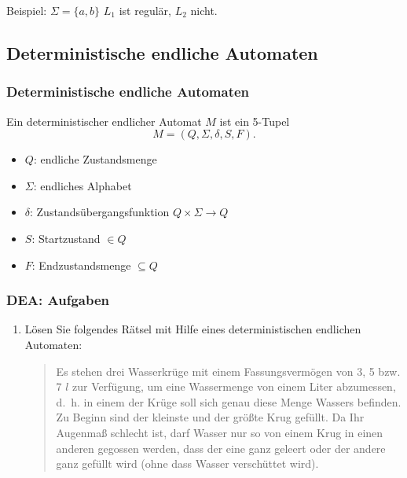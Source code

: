 \documentclass{beamer}
\begin{document}
{\begin{frame}
\begin{itemize}
\end{itemize}
Beispiel:
\(\Sigma = \{a,b\}\)
	\(L_1\) ist regulär, \(L_2\) nicht.
\end{frame}

\subsection{Deterministische endliche Automaten}
\begin{frame}
\frametitle{Deterministische endliche Automaten}
        Ein deterministischer endlicher Automat $M$ ist ein 5-Tupel
        \[
        M= (Q,\Sigma,\delta,S,F).
        \]
        \begin{itemize}
        \item $Q$:  endliche Zustandsmenge
        \item $\Sigma$:    endliches Alphabet
        \item $\delta$:   Zustandsübergangsfunktion $Q\times \Sigma \rightarrow Q$
        \item $S$:   Startzustand $\in Q$
        \item $F$:   Endzustandsmenge $\subseteq Q$
        \end{itemize}
\end{frame}
\begin{frame}
	\frametitle{DEA: Aufgaben}
	\begin{enumerate}
	\item 
		Lösen Sie folgendes Rätsel mit Hilfe eines deterministischen
		endlichen Automaten:
		\begin{quote}
		  Es stehen drei Wasserkrüge mit einem Fassungsvermögen
		  von 3, 5 bzw. 7 $l$ zur Verfügung, um eine Wassermenge von
		  einem Liter abzumessen, d.~h. in einem der Krüge soll sich genau
		  diese Menge Wassers befinden. Zu Beginn sind der kleinste und
		  der größte Krug gefüllt. Da Ihr Augenmaß schlecht
		  ist, darf Wasser nur so von einem Krug in einen anderen
		  gegossen werden, dass der eine ganz geleert oder der andere
		  ganz gefüllt wird (ohne dass Wasser verschüttet wird).
		\end{quote}

\end{enumerate}
\end{frame}}
\end{document}
